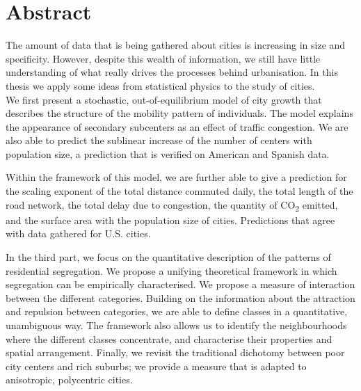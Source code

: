 

\begingroup
\let\clearpage\relax
\let\cleardoublepage\relax
\let\cleardoublepage\relax

\chapter*{Abstract} %


The amount of data that is being gathered about cities is increasing in size and
specificity. However, despite this wealth of information, we still have little
understanding of what really drives the processes behind urbanisation. In this
thesis we apply some ideas from statistical physics to the study of cities.\\ 


We first present a stochastic, out-of-equilibrium model of city growth that describes
the structure of the mobility pattern of individuals. The model explains the
appearance of secondary subcenters as an effect of traffic congestion. We are
also able to predict the sublinear increase of the number of centers with
population size, a prediction that is verified on American and Spanish data. 

Within the framework of this model, we are further able to give a prediction for the
scaling exponent of the total distance commuted daily, the total length of the
road network, the total delay due to congestion, the quantity of
CO\textsubscript{2} emitted, and the surface area with the population size of
cities. Predictions that agree with data gathered for U.S. cities.

In the third part, we focus on the quantitative description of the
patterns of residential segregation. We propose a unifying theoretical framework
in which segregation can be empirically characterised. We propose a measure of
interaction between the different categories. Building on the information about
the attraction and repulsion between categories, we are able to define classes
in a quantitative, unambiguous way. The framework also allows us to identify the
neighbourhoods where the different classes concentrate, and characterise their
properties and spatial arrangement. Finally, we revisit the traditional
dichotomy between poor city centers and rich suburbs; we provide a measure that
is adapted to anisotropic, polycentric cities.

